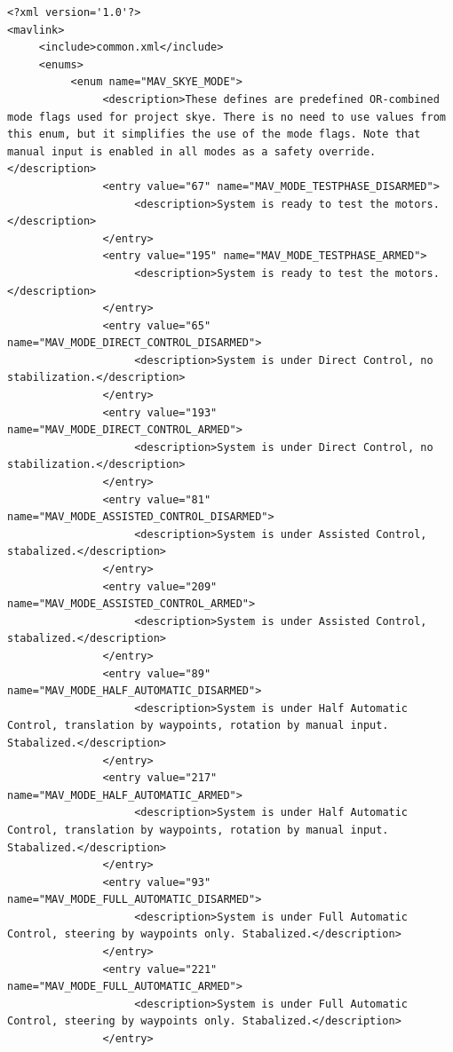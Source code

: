 \begin{lstlisting}[captionpos=b, caption="Definition of \textsc{Skye} specific Mavlink messages", label=app_xml]
<?xml version='1.0'?>
<mavlink>
     <include>common.xml</include>
     <enums>
          <enum name="MAV_SKYE_MODE">
               <description>These defines are predefined OR-combined mode flags used for project skye. There is no need to use values from this enum, but it simplifies the use of the mode flags. Note that manual input is enabled in all modes as a safety override.</description>
               <entry value="67" name="MAV_MODE_TESTPHASE_DISARMED">
                    <description>System is ready to test the motors.</description>
               </entry>
               <entry value="195" name="MAV_MODE_TESTPHASE_ARMED">
                    <description>System is ready to test the motors.</description>
               </entry>
               <entry value="65" name="MAV_MODE_DIRECT_CONTROL_DISARMED">
                    <description>System is under Direct Control, no stabilization.</description>
               </entry>
               <entry value="193" name="MAV_MODE_DIRECT_CONTROL_ARMED">
                    <description>System is under Direct Control, no stabilization.</description>
               </entry>
               <entry value="81" name="MAV_MODE_ASSISTED_CONTROL_DISARMED">
                    <description>System is under Assisted Control, stabalized.</description>
               </entry>
               <entry value="209" name="MAV_MODE_ASSISTED_CONTROL_ARMED">
                    <description>System is under Assisted Control, stabalized.</description>
               </entry>
               <entry value="89" name="MAV_MODE_HALF_AUTOMATIC_DISARMED">
                    <description>System is under Half Automatic Control, translation by waypoints, rotation by manual input. Stabalized.</description>
               </entry>
               <entry value="217" name="MAV_MODE_HALF_AUTOMATIC_ARMED">
                    <description>System is under Half Automatic Control, translation by waypoints, rotation by manual input. Stabalized.</description>
               </entry>
               <entry value="93" name="MAV_MODE_FULL_AUTOMATIC_DISARMED">
                    <description>System is under Full Automatic Control, steering by waypoints only. Stabalized.</description>
               </entry>
               <entry value="221" name="MAV_MODE_FULL_AUTOMATIC_ARMED">
                    <description>System is under Full Automatic Control, steering by waypoints only. Stabalized.</description>
               </entry>

\end{lstlisting}
